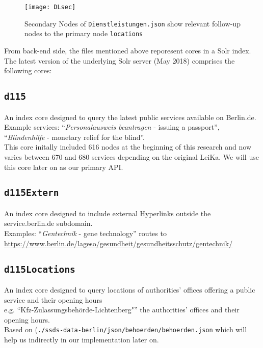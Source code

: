 \begin{figure}[H]
	\caption[Secondary Nodes of \texttt{Dienstleistungen.json} ]{Secondary Nodes of \texttt{Dienstleistungen.json} show relevant follow-up nodes to the primary node \texttt{locations}}
	\label{LeiKaJSON2}
	\texttt{[image: DLsec]}
\end{figure}







\begin{flushleft}


From back-end side, the files mentioned above reporesent cores in a Solr index. The latest version of the underlying Solr server (May 2018) comprises the following cores:

	\subsection*{\texttt{d115}}
	 An index core designed to query the latest public services available on Berlin.de. \\ Example services: ``\textit{Personalausweis beantragen} - issuing a passport'', ``\textit{Blindenhilfe} - monetary relief for the blind''.\\  This core initally included 616 nodes at the beginning of this research and now varies between 670 and 680 services depending on the original LeiKa. We will use this core later on as our primary API.
	
\subsection*{\texttt{d115Extern}}
	An index core designed to include external Hyperlinks outside the service.berlin.de subdomain.\\
	Examples: ``\textit{Gentechnik} - gene technology'' routes to 
	\url{https://www.berlin.de/lageso/gesundheit/gesundheitsschutz/gentechnik/}
	
	\subsection*{\texttt{d115Locations}}
	An index core designed to query locations of authorities' offices offering a public service and their opening hours\\ %
	e.g. ``Kfz-Zulassungsbehörde-Lichtenberg"''
	the authorities' offices and their opening hours.\\
	Based on (\texttt{./ssds-data-berlin/json/behoerden/behoerden.json} which will help us indirectly in our implementation later on. 
	

\end{flushleft}
